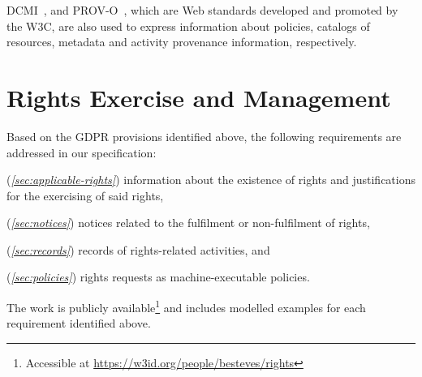 \documentclass{IOS-Book-Article}     %
\begin{document}
DCMI~\cite{dcmi_2020}, and 
PROV-O~\cite{lebo_prov_2013}, 
which are Web standards developed and promoted by the W3C, are also used to express information about policies, catalogs of resources, metadata and activity provenance information, respectively.

\section{Rights Exercise and Management}
\label{sec:rights}

Based on the GDPR provisions identified above, the following requirements are addressed in our specification:
\begin{inlineabc}
    \item[(\textit{\ref{sec:applicable-rights}})] information about the existence of rights and justifications for the exercising of said rights, %
    \item[(\textit{\ref{sec:notices}})] notices related to the fulfilment or non-fulfilment of rights,
    \item[(\textit{\ref{sec:records}})] records of rights-related activities, and
    \item[(\textit{\ref{sec:policies}})] rights requests as machine-executable policies.
\end{inlineabc}
The work is publicly available\footnote{Accessible at  \url{https://w3id.org/people/besteves/rights}} and includes modelled examples for each requirement identified above.
\end{document}
